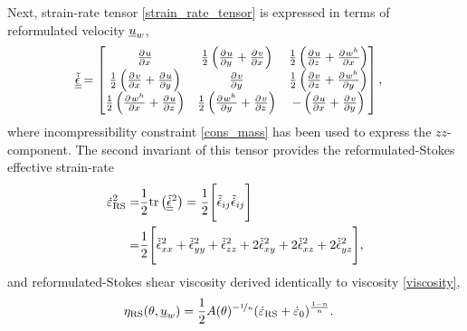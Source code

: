 Next, strain-rate tensor \cref{strain_rate_tensor} is expressed in terms of reformulated velocity $\underline{u}_w$, 
\begin{align}
  \label{rs_strain_rate_tensor}
  \tilde{\underline{\underline{\dot{\epsilon}}}}
  &= \begin{bmatrix}
       \frac{\partial{^{}} u}{\partial x{^{}} } & \frac{1}{2}\left( \frac{\partial{^{}} u}{\partial y{^{}} } + \frac{\partial{^{}} v}{\partial x{^{}} } \right) & \frac{1}{2}\left( \frac{\partial{^{}} u}{\partial z{^{}} } + \frac{\partial{^{}} w^h}{\partial x{^{}} } \right) \\
       \frac{1}{2}\left( \frac{\partial{^{}} v}{\partial x{^{}} } + \frac{\partial{^{}} u}{\partial y{^{}} } \right) & \frac{\partial{^{}} v}{\partial y{^{}} } & \frac{1}{2}\left( \frac{\partial{^{}} v}{\partial z{^{}} } + \frac{\partial{^{}} w^h}{\partial y{^{}} } \right) \\
       \frac{1}{2}\left( \frac{\partial{^{}} w^h}{\partial x{^{}} } + \frac{\partial{^{}} u}{\partial z{^{}} } \right) & \frac{1}{2}\left( \frac{\partial{^{}} w^h}{\partial y{^{}} } + \frac{\partial{^{}} v}{\partial z{^{}} } \right) & -\left( \frac{\partial{^{}} u}{\partial x{^{}} } + \frac{\partial{^{}} v}{\partial y{^{}} } \right)
     \end{bmatrix},
\end{align}
where incompressibility constraint \cref{cons_mass} has been used to express the $zz$-component.  The second invariant of this tensor provides the reformulated-Stokes effective strain-rate
\begin{align}
  \dot{\varepsilon}_{\text{RS}}^2 = & \frac{1}{2} \mathrm{tr}\left( \tilde{\underline{\underline{\dot{\epsilon}}}}^2 \right) = \frac{1}{2} \Bigg[ \tilde{\dot{\epsilon}}_{ij} \tilde{\dot{\epsilon}}_{ij} \Bigg] \notag \\
  \label{rs_effective_strain_rate}
  = &\frac{1}{2} \Bigg[ \tilde{\dot{\epsilon}}_{xx}^2 + \tilde{\dot{\epsilon}}_{yy}^2 + \tilde{\dot{\epsilon}}_{zz}^2 + 2\tilde{\dot{\epsilon}}_{xy}^2 + 2\tilde{\dot{\epsilon}}_{xz}^2 + 2\tilde{\dot{\epsilon}}_{yz}^2 \Bigg],
\end{align}
and reformulated-Stokes shear viscosity derived identically to viscosity \cref{viscosity},
\begin{align}
  \label{rs_viscosity}
  \eta_{\text{RS}}(\theta, \underline{u}_w) &= \frac{1}{2}A(\theta)^{-\nicefrac{1}{n}} (\dot{\varepsilon}_{\text{RS}} + \dot{\varepsilon}_0)^{\frac{1-n}{n}}.
\end{align} 

